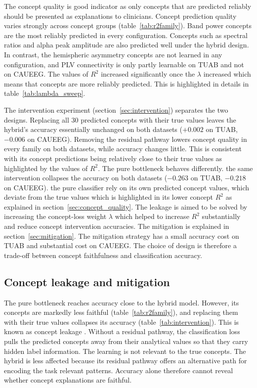 \documentclass[journal,twoside,web]{ieeecolor}
\begin{document}
The concept quality is good indicator as only concepts that are predicted reliably should be presented as explanations to clinicians. Concept prediction quality varies strongly across concept groups (table~\ref{tab:r2family}). Band power concepts are the most reliably predicted in every configuration. Concepts such as spectral ratios and alpha peak amplitude are also predicted well under the hybrid design. In contrast, the
hemispheric asymmetry concepts are not learned in any configuration, and PLV connectivity is only partly learnable on TUAB and not on CAUEEG. The values of $R^2$ increased significantly once the $\lambda$ increased which means that concepts are more reliably predicted. This is highlighted in details in table~\ref{tab:lambda_sweep}.


The intervention experiment (section~\ref{sec:intervention}) separates the two designs. Replacing all $30$ predicted concepts with their true values leaves the hybrid's accuracy essentially unchanged on both datasets ($+0.002$ on TUAB, $-0.006$ on CAUEEG). Removing the residual pathway lowers concept quality in every family on both datasets, while accuracy changes little. This is consistent with its concept predictions being relatively close to their true values as highlighted by the values of $R^2$. The pure bottleneck behaves differently. the same intervention collapses the accuracy on both datasets ($-0.263$ on TUAB, $-0.218$ on CAUEEG). the pure classifier rely on its own predicted concept values, which deviate from the true values which is highlighted in its lower concept $R^2$ as explained in section~\ref{sec:concept_quality}. The leakage is aimed to be solved by increasing the concept-loss weight $\lambda$ which helped to increase $R^2$ substantially and reduce concept intervention accuracies. The mitigation is explained in section~\ref{sec:mitigation}. The mitigation strategy has a small accuracy cost on TUAB and substantial cost on CAUEEG. The choice of design is therefore a trade-off between concept faithfulness and classification accuracy.



\subsection{Concept leakage and mitigation}
\label{sec:discussion_leakage}

The pure bottleneck reaches accuracy close to the hybrid model. However, its concepts are markedly less faithful (table~\ref{tab:r2family}), and replacing them with their true values collapses its accuracy (table~\ref{tab:intervention}). This is known as concept leakage \cite{mahinpei2021, havasi2022}. Without a residual pathway, the classification loss pulls the predicted concepts away from their analytical values so that they carry hidden label information. The learning is not relevant to the true concepts. The hybrid is less affected because its residual pathway offers an alternative path for encoding the task relevant patterns. Accuracy alone therefore cannot reveal whether concept explanations are faithful.
\end{document}
